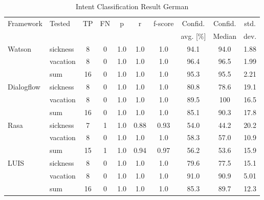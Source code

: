 \begin{table}[h]
    \centering
    \begin{tabular}{ l | l | c | c | c | c | c | c | c | c }
        \multirow{2}{*}{Framework} & \multirow{2}{*}{Tested} & \multirow{2}{*}{TP} & \multirow{2}{*}{FN} & \multirow{2}{*}{p} & \multirow{2}{*}{r} & \multirow{2}{*}{f-score} & Confid. & Confid. & std.\\ 
                 &&          &            &   & & & avg. [\%] & Median & dev.  \\ \hline \hline
        \multirow{3}{*}{Watson} 
        & sickness & 8 & 0& 1.0& 1.0& 1.0&94.1& 94.0& 1.88\\
        & vacation & 8 & 0& 1.0& 1.0& 1.0&96.4& 96.5&1.99\\
        & sum      &16 & 0& 1.0& 1.0& 1.0&95.3& 95.5&2.21 \\ \hline
        
        \multirow{3}{*}{Dialogflow} 
        & sickness & 8& 0& 1.0& 1.0& 1.0&80.8& 78.6&19.1\\
        & vacation & 8& 0& 1.0& 1.0& 1.0&89.5& 100& 16.5\\
        & sum      &16& 0& 1.0& 1.0& 1.0&85.1&90.3 &17.8\\ \hline

        \multirow{3}{*}{Rasa} 
        & sickness & 7& 1& 1.0& 0.88  & 0.93& 54.0& 44.2&20.2\\
        & vacation & 8& 0& 1.0& 1.0& 1.0& 58.3& 57.0&10.9\\
        & sum      &15& 1& 1.0& 0.94& 0.97& 56.2&53.6 &15.9\\ \hline

        \multirow{3}{*}{LUIS} 
        & sickness & 8& 0& 1.0& 1.0 & 1.0& 79.6& 77.5&15.1\\
        & vacation & 8& 0& 1.0& 1.0 & 1.0& 91.0& 90.9&5.01\\
        & sum      & 16&0& 1.0& 1.0 & 1.0& 85.3& 89.7&12.3\\
    \end{tabular}
    \caption{Intent Classification Result German} \label{tab:intent_classification_result_de}
\end{table} \noindent

